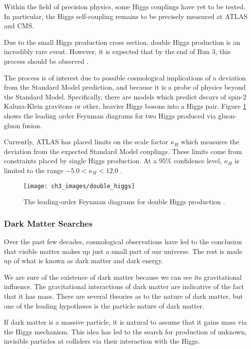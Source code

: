 \documentclass[10pt,a4paper]{book}
\begin{document}
Within the field of precision physics, some Higgs couplings have yet to be tested. In particular, the Higgs self-coupling remains to be precisely measured at ATLAS and CMS. 

Due to the small Higgs production cross section, double Higgs production is an incredibly rare event. However, it is expected that by the end of Run 3, this process should be observed \cite{Chen:2017khz}. 

The process is of interest due to possible cosmological implications of a deviation from the Standard Model prediction, and because it is a probe of physics beyond the Standard Model. Specifically, there are models which predict 
decays of spin-2 Kaluza-Klein gravitons or other, heavier Higgs bosons into a Higgs pair. Figure \ref{double Higgs} shows the leading order Feynman diagrams for two Higgs produced via gluon-gluon fusion.
 
Currently, ATLAS has placed limits on the scale factor $\kappa_H$ which measures the deviation from the expected Standard Model couplings. These limits come from constraints placed by single Higgs production. At a 95\% confidence level, $\kappa_H$ is limited to the range $-5.0 < \kappa_H < 12.0$ \cite{ATLAS:2019qdc}.

\begin{figure}
\centering
\texttt{[image: ch3\_images/double\_higgs]}
\caption{The leading-order Feynman diagrams for double Higgs production \cite{ATLAS:2019qdc}.}
\label{double Higgs}
\end{figure}

\subsubsection{Dark Matter Searches}

Over the past few decades, cosmological observations have led to the conclusion that visible matter makes up just a small part of our universe. The rest is made up of what is known as dark matter and dark energy.

We are sure of the existence of dark matter because we can see its gravitational influence. The gravitational interactions of dark matter are indicative of the fact that it has mass. There are several theories as to the nature of dark matter, but one of the leading hypotheses is the particle nature of dark matter.

If dark matter is a massive particle, it is natural to assume that it gains mass via the Higgs mechanism. This idea has led to the search for production of unknown, invisible particles at colliders via their interaction with the Higgs. 
\end{document}
